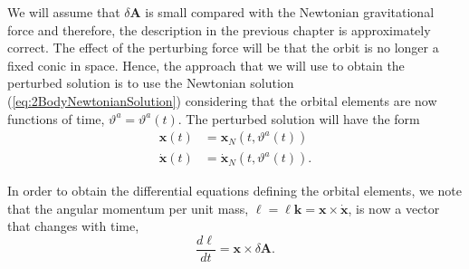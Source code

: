 We will assume that $ \delta \textbf{A} $ is small compared with the Newtonian gravitational force and therefore, the description in the previous chapter is approximately correct. The effect of the perturbing force will be that the orbit is no longer a fixed conic in space. Hence, the approach that we will use to obtain the perturbed solution is to use the Newtonian solution (\ref{eq:2BodyNewtonianSolution}) considering that the orbital elements are now functions of time, $\vartheta^a = \vartheta^a (t)$.  
The perturbed solution will have the form 
\begin{subequations} 
\begin{align}
\textbf{x} (t) &= \textbf{x}_N (t, \vartheta^a (t)) \\
\dot{\textbf{x}} (t) &= \dot{\textbf{x}}_N (t, \vartheta^a (t)) .
\end{align}
\end{subequations}

%
%
%

In order to obtain the differential equations defining the orbital elements, we note that the angular momentum per unit mass, $\boldsymbol{\ell} = \ell \textbf{k} = \textbf{x} \times \dot{\textbf{x}}$, is now a vector that changes with time,
\begin{equation}
\frac{d\boldsymbol{ \ell}}{dt} = \textbf{x} \times \delta \textbf{A}.
\end{equation}

